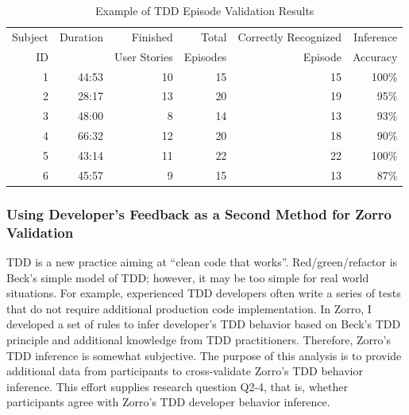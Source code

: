 \begin{table}[!h]
\centering
  \begin{tabular}{|r|r|r|r|r|r|}
  \hline
    Subject & Duration & Finished & Total & Correctly Recognized & Inference\\ 
    ID &  & User Stories & Episodes & Episode & Accuracy \\ \hline
    1 & 44:53 & 10 & 15 & 15 & 100\% \\ \hline
    2 & 28:17 & 13 & 20 & 19 & 95\% \\ \hline
    3 & 48:00 & 8 & 14 & 13 & 93\% \\ \hline
    4 & 66:32 & 12 & 20 & 18 & 90\% \\ \hline
    5 & 43:14 & 11 & 22 & 22 & 100\% \\ \hline
    6 & 45:57 &  9 & 15 & 13 & 87\% \\
  \hline
  \end{tabular}
  \caption{Example of TDD Episode Validation Results}\label{tab:EpisodeValidationSummary}  
\end{table}

\subsubsection{Using Developer's Feedback as a Second Method for Zorro Validation}
TDD is a new practice aiming at ``clean code that
works''. Red/green/refactor is Beck's simple model of TDD; however, it
may be too simple for real world situations. For example, experienced
TDD developers often write a series of tests that do not require
additional production code implementation. In Zorro, I developed a set
of rules to infer developer's TDD behavior based on Beck's TDD
principle and additional knowledge from TDD practitioners. Therefore,
Zorro's TDD inference is somewhat subjective.  The purpose of this
analysis is to provide additional data from participants to
cross-validate Zorro's TDD behavior inference. This effort supplies 
research question Q2-4, that is, whether participants agree with
Zorro's TDD developer behavior inference.


